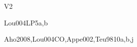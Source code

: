\begin{syllabus}
\begin{competences}{V2}
    \item {} 
    \item {} 
\end{competences}

\begin{unit}{\PLProgramRepresentation}{}{Lou004LP}{5}{a,b}
\begin{topics}%
	\item \PLProgramRepresentationTopicPrograms
	\item \PLProgramRepresentationTopicAbstract
	\item \PLProgramRepresentationTopicData
	\item \PLRuntimeSystemsTopicJust
	\item \PLRuntimeSystemsTopicOther
\end{topics}

\begin{learningoutcomes}
	\item \PLProgramRepresentationLOExplainHowProcess [\Familiarity]
	\item \PLProgramRepresentationLODescribeAnTree [\Familiarity]
	\item \PLProgramRepresentationLODescribeTheHaving [\Familiarity]
	\item \PLProgramRepresentationLOWriteAProcess [\Familiarity]
	\item \PLRuntimeSystemsLOExplainTheMetadata [\Familiarity]
	\item \PLRuntimeSystemsLODiscussAdvantages [\Familiarity]
	\item \PLRuntimeSystemsLOIdentifyTheBy [\Familiarity]
\end{learningoutcomes}
\end{unit}

\begin{unit}{\PLLanguageTranslationandExecution}{}{Aho2008,Lou004CO,Appe002,Teu98}{10}{a,b,j}
\begin{topics}%
	\item \PLLanguageTranslationandExecutionTopicInterpretation
	\item \PLLanguageTranslationandExecutionTopicLanguage
	\item \PLLanguageTranslationandExecutionTopicRun
	\item \PLLanguageTranslationandExecutionTopicRunTime
	\item \PLLanguageTranslationandExecutionTopicMemory
\end{topics}
\begin{learningoutcomes}
  

\end{learningoutcomes}
\end{unit}
\end{syllabus}
